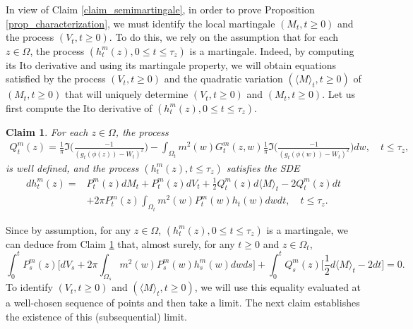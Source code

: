 \documentclass{article}
\newtheorem{claim}[theorem]{Claim}
\theoremstyle{definition}
\theoremstyle{remark}
\theoremstyle{remark}
\begin{document}
In view of Claim \ref{claim_semimartingale}, in order to prove Proposition \ref{prop_characterization}, we must identify the local martingale $(M_t, t\geq 0)$ and the process $(V_t, t\geq 0)$. To do this, we rely on the assumption that for each $z \in \Omega$, the process $(h_t^m(z), 0 \leq t \leq \tau_z)$ is a martingale. Indeed, by computing its Ito derivative and using its martingale property, we will obtain equations satisfied by the process $(V_t, t \geq 0)$ and the quadratic variation $(\langle M \rangle_t, t \geq 0)$ of $(M_t, t\geq 0)$ that will uniquely determine $(V_t, t \geq 0)$ and $(M_t, t \geq 0)$. Let us first compute the Ito derivative of $(h_t^m(z), 0 \leq t \leq \tau_z)$.

\begin{claim} \label{claim_SDE}
For each $z \in \Omega$, the process 
\begin{align*}
    Q_t^m(z) = \frac{1}{\pi} \Im \bigg( \frac{-1}{(g_t(\phi(z))-W_t)^2} \bigg) - \int_{\Omega_t} m^2(w) G_t^m(z,w) \frac{1}{\pi} \Im \bigg( \frac{-1}{(g_t(\phi(w))-W_t)^2} \bigg) dw, \quad t \leq \tau_{z},
\end{align*} is well defined, and the process $(h_t^m(z), t \leq \tau_z)$ satisfies the SDE
\begin{align} \label{SDE_h}
    dh_t^m(z) = &P_t^m(z)dM_t + P_t^m(z) dV_t + \frac{1}{2}Q_t^{m}(z)d\langle M \rangle_t -2Q^m_t(z)dt \nonumber \\
    &+ 2\pi P_t^m(z) \int_{\Omega_t}m^2(w)P_t^m(w)h_t(w) dw dt, \quad t \leq \tau_z.
\end{align}
\end{claim}

Since by assumption, for any $z \in \Omega$, $(h_t^m(z), 0 \leq t \leq \tau_z)$ is a martingale, we can deduce from Claim \ref{claim_SDE} that, almost surely, for any $t \geq 0$ and $z \in \Omega_t$,
\begin{equation} \label{eq_0mart}
    \int_{0}^{t} P_s^m(z)\bigg[ dV_s + 2\pi \int_{\Omega_s} m^2(w)P_s^m(w)h_s^m(w) dw ds \bigg] + \int_{0}^{t} Q_s^m(z) \bigg[\frac{1}{2}d\langle M \rangle_t -2dt \bigg] = 0.
\end{equation}
To identify $(V_t, t \geq 0)$ and $(\langle M \rangle_t, t \geq 0)$, we will use this equality evaluated at a well-chosen sequence of points and then take a limit. The next claim establishes the existence of this (subsequential) limit. 
\end{document}

